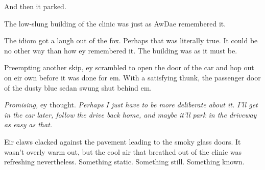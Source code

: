 And then it parked.

The low-slung building of the clinic was just as AwDae remembered it.

The idiom got a laugh out of the fox. Perhaps that was literally true. It could be no other way than how ey remembered it. The building was as it must be.

Preempting another skip, ey scrambled to open the door of the car and hop out on eir own before it was done for em. With a satisfying thunk, the passenger door of the dusty blue sedan swung shut behind em.

\emph{Promising,} ey thought. \emph{Perhaps I just have to be more deliberate about it. I'll get in the car later, follow the drive back home, and maybe it'll park in the driveway as easy as that.}

Eir claws clacked against the pavement leading to the smoky glass doors. It wasn't overly warm out, but the cool air that breathed out of the clinic was refreshing nevertheless. Something static. Something still. Something known.
